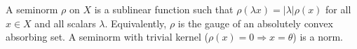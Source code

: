 A seminorm $\rho$ on $X$ is a sublinear function such that $\rho(\lambda x) = |\lambda|\rho(x)$ for all $x \in X$ and all scalars $\lambda$. Equivalently, $\rho$ is the gauge of an absolutely convex absorbing set. A seminorm with trivial kernel ($\rho(x) = 0 \Rightarrow x = \theta$) is a norm.